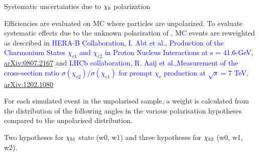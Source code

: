 \begin{frame}{Systematic uncertainties due to $\chi_{b}$ polarization}
\begin{block}{}
\small
Efficiencies are evaluated on MC where \chib particles are unpolarized. To evaluate systematic effects due to the unknown polarization of \chib, MC events are reweighted as described in \textcolor{blue}{HERA-B Collaboration, I. Abt et al.,  Production of the Charmonium States $\chi_{c1}$ and $\chi_{c2}$ in Proton Nucleus Interactions at s = 41.6-GeV}, \href{http://arxiv.org/abs/0807.2167}{arXiv:0807.2167} and
\textcolor{blue}{LHCb collaboration, R. Aaij et al.,Measurement of the cross-section ratio $\sigma(\chi_{c2})/\sigma(\chi_{c1})$ for prompt $\chi_c$
production at $\sqrt{s}=7$ TeV}, \href{http://arxiv.org/abs/1202.1080}{arXiv:1202.1080}
\end{block}
For each simulated event in the unpolarised sample, a weight is calculated from
the distribution of the following angles in the various polarisation hypotheses compared to the
unpolarised distribution.


\vspace{0.1in}

Two hypotheses for $\chi_{b 1}$ state (w0, w1) and three hypotheses for $\chi_{b 2}$ (w0, w1, w2).

\end{frame}